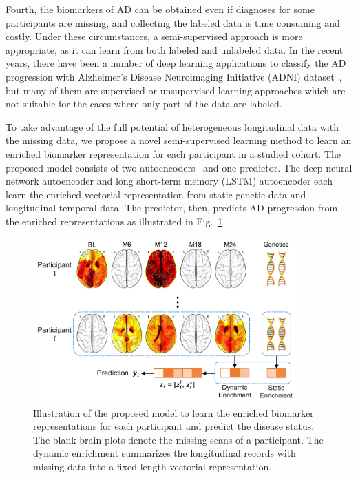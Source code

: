Fourth, the biomarkers of AD can be obtained even if diagnoses for some participants are missing, and collecting the labeled data is time consuming and costly. Under these circumstances, a semi-supervised approach is more appropriate, as it can learn from both labeled and unlabeled data.
In the recent years, there have been a number of deep learning applications to classify the AD progression with Alzheimer's Disease Neuroimaging Initiative (ADNI) dataset~\cite{vieira2017using}, but many of them are supervised or unsupervised learning approaches which are not suitable for the cases where only part of the data are labeled.

To take advantage of the full potential of heterogeneous longitudinal data with the missing data, we propose a novel semi-supervised learning method to learn an enriched biomarker representation for each participant in a studied cohort. The proposed model consists of two autoencoders~\cite{kramer1991nonlinear} and one predictor. The deep neural network autoencoder and long short-term memory (LSTM) autoencoder each learn the enriched vectorial representation from static genetic data and longitudinal temporal data. The predictor, then, predicts AD progression from the enriched representations as illustrated in Fig.~\ref{fig: overview}.
\begin{figure}[h]
    \centering
    \includegraphics[width=0.9\textwidth]{images/overview.pdf}
    \caption{Illustration of the proposed model to learn the enriched biomarker representations for each participant and predict the disease status. The blank brain plots denote the missing scans of a participant. The dynamic enrichment summarizes the longitudinal records with missing data into a fixed-length vectorial representation.} \label{fig: overview}
\end{figure}

